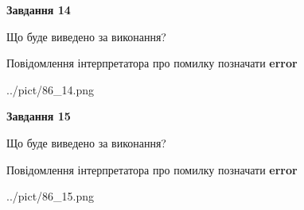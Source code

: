 \documentclass[11pt, ukrainian]{article}
\begin{document}
{\begin {large}
{\begin {center}\textbf{Завдання 14}\end {center}}\par
Що буде виведено за виконання? \par
Повідомлення інтерпретатора про помилку позначати \textbf{error}

\begin{center}
	{../pict/86_14.png}
\end{center}
\newpage

{\begin {center}\textbf{Завдання 15}\end {center}}\par
Що буде виведено за виконання? \par
Повідомлення інтерпретатора про помилку позначати \textbf{error}

\begin{center}
	{../pict/86_15.png}
\end{center}
\newpage

\end {large}}
\end{document}
